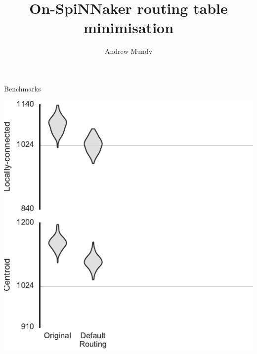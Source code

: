 \documentclass[t]{beamer}
\title{On-SpiNNaker routing table minimisation}
\author{Andrew Mundy}
\begin{document}
\maketitle

\begin{frame}{Benchmarks}
  
\end{frame}

\begin{frame}[plain]{}
  \begin{center}
    \includegraphics[page=1]{../experiments/presentation_plots}
  \end{center}
\end{frame}
\end{document}

